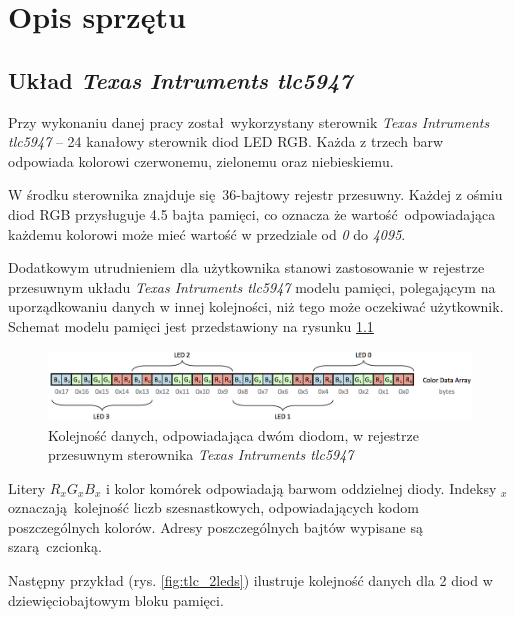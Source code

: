\documentclass[eng,printmode]{mgr}
\begin{document}
\chapter{Opis sprzętu}

\section{Układ \emph{Texas Intruments tlc5947}}
Przy wykonaniu danej pracy został wykorzystany sterownik \emph{Texas Intruments tlc5947} -- 24 kanałowy sterownik diod LED RGB\cite{tlcDoc}. Każda z trzech barw odpowiada kolorowi czerwonemu, zielonemu oraz niebieskiemu.

W środku sterownika znajduje się 36-bajtowy rejestr przesuwny. Każdej z ośmiu diod RGB przysługuje 4.5 bajta pamięci, co oznacza że wartość odpowiadająca każdemu kolorowi może mieć wartość w przedziale od \emph{0} do \emph{4095}\cite{tlcDoc}. 

Dodatkowym utrudnieniem dla użytkownika stanowi zastosowanie w rejestrze przesuwnym układu \emph{Texas Intruments tlc5947} modelu pamięci, polegającym na uporządkowaniu danych w innej kolejności, niż tego może oczekiwać użytkownik. Schemat modelu pamięci jest przedstawiony na rysunku \ref{fig:tlc_array}

\begin{figure}[!ht]
    \centering
    \includegraphics[width=\textwidth]{Figures/tlc_array.png} 
    \caption{Kolejność danych, odpowiadająca dwóm diodom, w rejestrze przesuwnym sterownika \emph{Texas Intruments tlc5947}}
    \label{fig:tlc_array}
\end{figure}

Litery $R_x G_x B_x$ i kolor komórek odpowiadają barwom oddzielnej diody. Indeksy $_x$ oznaczają kolejność liczb szesnastkowych, odpowiadających kodom poszczególnych kolorów. Adresy poszczególnych bajtów wypisane są szarą czcionką. 

Następny przykład (rys. \ref{fig:tlc_2leds}) ilustruje kolejność danych dla 2 diod w dziewięciobajtowym bloku pamięci.
\end{document}
